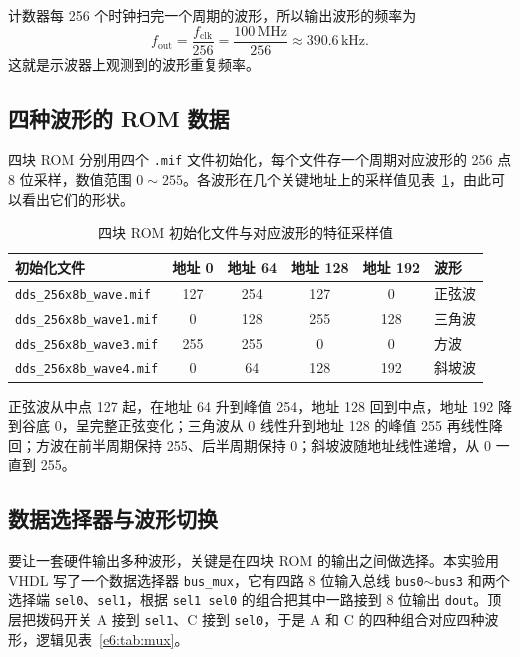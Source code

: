 \documentclass{ctexrep}
\begin{document}
计数器每 256 个时钟扫完一个周期的波形，所以输出波形的频率为
\[
    f_{\text{out}} = \frac{f_{\text{clk}}}{256} = \frac{100\,\text{MHz}}{256} \approx 390.6\,\text{kHz}.
\]
这就是示波器上观测到的波形重复频率。

\subsection{四种波形的 ROM 数据}

四块 ROM 分别用四个 \texttt{.mif} 文件初始化，每个文件存一个周期对应波形的 256 点 8 位采样，数值范围 $0\sim255$。各波形在几个关键地址上的采样值见表~\ref{e6:tab:wavedata}，由此可以看出它们的形状。

\begin{table}[H]
    \centering
    \caption{四块 ROM 初始化文件与对应波形的特征采样值}
    \label{e6:tab:wavedata}
    \small
    \begin{tabular}{lccccl}
        \toprule
        \textbf{初始化文件} & \textbf{地址 0} & \textbf{地址 64} & \textbf{地址 128} & \textbf{地址 192} & \textbf{波形} \\
        \midrule
        \texttt{dds\_256x8b\_wave.mif}  & 127 & 254 & 127 & 0   & 正弦波 \\
        \texttt{dds\_256x8b\_wave1.mif} & 0   & 128 & 255 & 128 & 三角波 \\
        \texttt{dds\_256x8b\_wave3.mif} & 255 & 255 & 0   & 0   & 方波 \\
        \texttt{dds\_256x8b\_wave4.mif} & 0   & 64  & 128 & 192 & 斜坡波 \\
        \bottomrule
    \end{tabular}
\end{table}

正弦波从中点 127 起，在地址 64 升到峰值 254，地址 128 回到中点，地址 192 降到谷底 0，呈完整正弦变化；三角波从 0 线性升到地址 128 的峰值 255 再线性降回；方波在前半周期保持 255、后半周期保持 0；斜坡波随地址线性递增，从 0 一直到 255。

\subsection{数据选择器与波形切换}

要让一套硬件输出多种波形，关键是在四块 ROM 的输出之间做选择。本实验用 VHDL 写了一个数据选择器 \texttt{bus\_mux}，它有四路 8 位输入总线 \texttt{bus0}$\sim$\texttt{bus3} 和两个选择端 \texttt{sel0}、\texttt{sel1}，根据 \texttt{sel1 sel0} 的组合把其中一路接到 8 位输出 \texttt{dout}。顶层把拨码开关 A 接到 \texttt{sel1}、C 接到 \texttt{sel0}，于是 A 和 C 的四种组合对应四种波形，逻辑见表~\ref{e6:tab:mux}。
\end{document}
